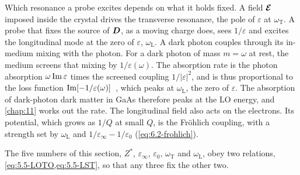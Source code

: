Which resonance a probe excites depends on what it holds fixed. A field $\bm{\mathcal{E}}$ imposed inside the crystal drives the transverse resonance, the pole of $\varepsilon$ at $\omega_{\mathrm{T}}$. A probe that fixes the source of $\bm{D}$, as a moving charge does, sees $1/\varepsilon$ and excites the longitudinal mode at the zero of $\varepsilon$, $\omega_{\mathrm{L}}$. A dark photon couples through its in-medium mixing with the photon. For a dark photon of mass $m = \omega$ at rest, the medium screens that mixing by $1/\varepsilon(\omega)$. The absorption rate is the photon absorption $\omega\operatorname{Im}\varepsilon$ times the screened coupling $1/|\varepsilon|^2$, and is thus proportional to the loss function $\operatorname{Im}[-1/\varepsilon(\omega)]$~\cite[Eqs.~(2) and~(3)]{knapen2018detection}, which peaks at $\omega_{\mathrm{L}}$, the zero of $\varepsilon$. The absorption of dark-photon dark matter in GaAs therefore peaks at the LO energy, and \cref{chap:11} works out the rate. The longitudinal field also acts on the electrons. Its potential, which grows as $1/Q$ at small $Q$, is the Fr\"ohlich coupling, with a strength set by $\omega_{\mathrm{L}}$ and $1/\varepsilon_\infty - 1/\varepsilon_0$ (\cref{eq:6.2-frohlich}).

The five numbers of this section, $Z^*$, $\varepsilon_\infty$, $\varepsilon_0$, $\omega_{\mathrm{T}}$ and $\omega_{\mathrm{L}}$, obey two relations, \cref{eq:5.5-LOTO,eq:5.5-LST}, so that any three fix the other two.
